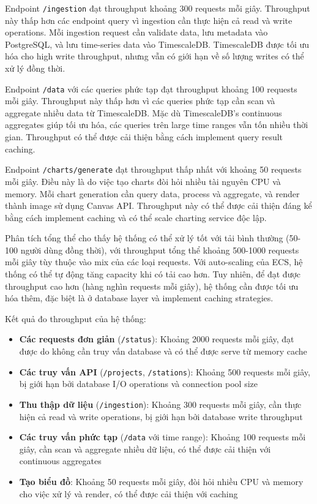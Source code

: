 Endpoint \texttt{/ingestion} đạt throughput khoảng 300 requests mỗi giây. Throughput này thấp hơn các endpoint query vì ingestion cần thực hiện cả read và write operations. Mỗi ingestion request cần validate data, lưu metadata vào PostgreSQL, và lưu time-series data vào TimescaleDB. TimescaleDB được tối ưu hóa cho high write throughput, nhưng vẫn có giới hạn về số lượng writes có thể xử lý đồng thời.

Endpoint \texttt{/data} với các queries phức tạp đạt throughput khoảng 100 requests mỗi giây. Throughput này thấp hơn vì các queries phức tạp cần scan và aggregate nhiều data từ TimescaleDB. Mặc dù TimescaleDB's continuous aggregates giúp tối ưu hóa, các queries trên large time ranges vẫn tốn nhiều thời gian. Throughput có thể được cải thiện bằng cách implement query result caching.

Endpoint \texttt{/charts/generate} đạt throughput thấp nhất với khoảng 50 requests mỗi giây. Điều này là do việc tạo charts đòi hỏi nhiều tài nguyên CPU và memory. Mỗi chart generation cần query data, process và aggregate, và render thành image sử dụng Canvas API. Throughput này có thể được cải thiện đáng kể bằng cách implement caching và có thể scale charting service độc lập.

Phân tích tổng thể cho thấy hệ thống có thể xử lý tốt với tải bình thường (50-100 người dùng đồng thời), với throughput tổng thể khoảng 500-1000 requests mỗi giây tùy thuộc vào mix của các loại requests. Với auto-scaling của ECS, hệ thống có thể tự động tăng capacity khi có tải cao hơn. Tuy nhiên, để đạt được throughput cao hơn (hàng nghìn requests mỗi giây), hệ thống cần được tối ưu hóa thêm, đặc biệt là ở database layer và implement caching strategies.

Kết quả đo throughput của hệ thống:

\begin{itemize}
    \item \textbf{Các requests đơn giản} (\texttt{/status}): Khoảng 2000 requests mỗi giây, đạt được do không cần truy vấn database và có thể được serve từ memory cache
    \item \textbf{Các truy vấn API} (\texttt{/projects}, \texttt{/stations}): Khoảng 500 requests mỗi giây, bị giới hạn bởi database I/O operations và connection pool size
    \item \textbf{Thu thập dữ liệu} (\texttt{/ingestion}): Khoảng 300 requests mỗi giây, cần thực hiện cả read và write operations, bị giới hạn bởi database write throughput
    \item \textbf{Các truy vấn phức tạp} (\texttt{/data} với time range): Khoảng 100 requests mỗi giây, cần scan và aggregate nhiều dữ liệu, có thể được cải thiện với continuous aggregates
    \item \textbf{Tạo biểu đồ}: Khoảng 50 requests mỗi giây, đòi hỏi nhiều CPU và memory cho việc xử lý và render, có thể được cải thiện với caching
\end{itemize}

